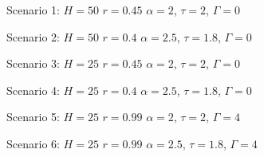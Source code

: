 \item Scenario 1: \(H=50\)  \(r=0.45\) \(\alpha=2\), \(\tau=2\), \(\Gamma=0\)
\item Scenario 2: \(H=50\)  \(r=0.4\) \(\alpha=2.5\), \(\tau=1.8\), \(\Gamma=0\)
\item Scenario 3: \(H=25\)  \(r=0.45\) \(\alpha=2\), \(\tau=2\), \(\Gamma=0\)
\item Scenario 4: \(H=25\)  \(r=0.4\) \(\alpha=2.5\), \(\tau=1.8\), \(\Gamma=0\)
\item Scenario 5: \(H=25\)  \(r=0.99\) \(\alpha=2\), \(\tau=2\), \(\Gamma=4\)
\item Scenario 6: \(H=25\)  \(r=0.99\) \(\alpha=2.5\), \(\tau=1.8\), \(\Gamma=4\)
